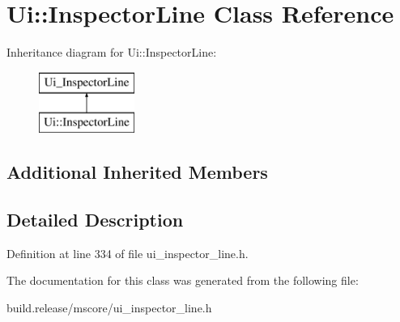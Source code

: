 \hypertarget{class_ui_1_1_inspector_line}{}\section{Ui\+:\+:Inspector\+Line Class Reference}
\label{class_ui_1_1_inspector_line}
Inheritance diagram for Ui\+:\+:Inspector\+Line\+:\begin{figure}[H]
\begin{center}
\leavevmode
\includegraphics[height=2.000000cm]{class_ui_1_1_inspector_line}
\end{center}
\end{figure}
\subsection*{Additional Inherited Members}


\subsection{Detailed Description}


Definition at line 334 of file ui\+\_\+inspector\+\_\+line.\+h.



The documentation for this class was generated from the following file\+:\begin{DoxyCompactItemize}
\item 
build.\+release/mscore/ui\+\_\+inspector\+\_\+line.\+h\end{DoxyCompactItemize}
